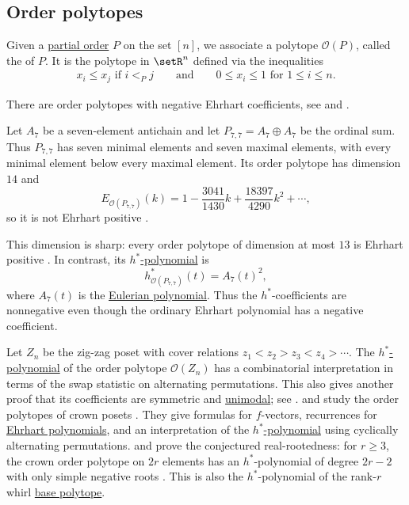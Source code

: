 \subsection[orderPolytope]{Order polytopes}

Given a \hyperref[poset]{partial order} $P$ on the set $[n]$, we associate a
polytope $\mathcal{O}(P)$, called the
\label{orderPolytopeDefinition} of $P$.
It is the polytope in $\setR^n$ defined via the inequalities
\begin{align}
x_i \leq x_j \text{ if } i <_P j
\qquad \text{and} \qquad
0 \leq x_i \leq 1 \text{ for } 1\leq i \leq n.
\end{align}

There are order polytopes with negative Ehrhart coefficients,
see \cite[Fig.~3.87]{StanleyEC1} and \cite{Alexandersson2019CounterExamples}.

\begin{example}
Let $A_7$ be a seven-element antichain and let
$P_{7,7}=A_7\oplus A_7$ be the ordinal sum.  Thus $P_{7,7}$ has seven
minimal elements and seven maximal elements, with every minimal element below
every maximal element.  Its order polytope has dimension $14$ and
\[
 E_{\mathcal O(P_{7,7})}(k)
 =1-\frac{3041}{1430}k+\frac{18397}{4290}k^2+\dotsb,
\]
so it is not Ehrhart positive
\cite[Ex.~3.2 and Table~1]{LiuTsuchiya2018}.

This dimension is sharp: every order polytope of dimension at most $13$ is
Ehrhart positive \cite[Thm.~3.1]{LiuXinZhang2026Dimension13}.  In contrast,
its \hyperref[hStarPolynomial]{$h^*$-polynomial} is
\[
 h^*_{\mathcal O(P_{7,7})}(t)=A_7(t)^2,
\]
where $A_7(t)$ is the \hyperref[eulerianPolynomial]{Eulerian polynomial}.
Thus the $h^*$-coefficients are nonnegative even though the ordinary Ehrhart
polynomial has a negative coefficient.
\end{example}


Let $Z_n$ be the zig-zag poset with cover relations
$z_1<z_2>z_3<z_4>\dotsb$.  The
\hyperref[hStarPolynomial]{$h^*$-polynomial} of the order polytope
$\mathcal{O}(Z_n)$ has a combinatorial interpretation in terms of the swap
statistic on alternating permutations.  This also gives another proof that
its coefficients are symmetric and \hyperref[unimodalPolynomial]{unimodal};
see \cite{CoonsSullivant2023}.
 and  study the order
polytopes of crown posets \cite{LundstromLeite2026}.  They give formulas for
$f$-vectors, recurrences for
\hyperref[ehrhartPolynomialDefinition]{Ehrhart polynomials}, and an
interpretation of the \hyperref[hStarPolynomial]{$h^*$-polynomial} using
cyclically alternating permutations.
 and  prove the conjectured
real-rootedness: for $r\geq3$, the crown order polytope on $2r$ elements
has an $h^*$-polynomial of degree $2r-2$ with only simple negative roots
\cite[Thm.~1]{CaoFu2026x}. This is also the $h^*$-polynomial of the
rank-$r$ whirl \hyperref[matroidPolytopes]{base polytope}.

